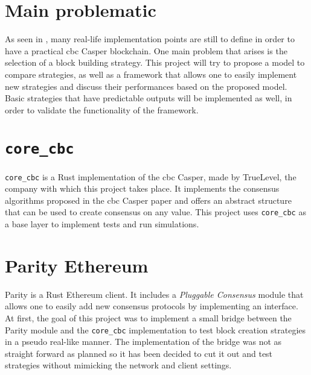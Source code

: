 \section{Main problematic}
As seen in , many real-life implementation points are still
to define in order to have a practical \gls{cbc} Casper blockchain. One main
problem that arises is the selection of a block building strategy. This project
will try to propose a model to compare strategies, as well as a framework that
allows one to easily implement new strategies and discuss their performances
based on the proposed model.  Basic strategies that have predictable outputs
will be implemented as well, in order to validate the functionality of the
framework.

\section{\texttt{core\_cbc}}
\texttt{core\_cbc} is a Rust implementation of the \gls{cbc} Casper, made by
TrueLevel, the company with which this project takes place. It implements the
consensus algorithms proposed in the \gls{cbc} Casper paper and offers an
abstract structure that can be used to create consensus on any value. This
project uses \texttt{core\_cbc} as a base layer to implement tests and run
simulations.

\section{Parity Ethereum}
Parity is a Rust Ethereum client. It includes a \textit{Pluggable Consensus}
module that allows one to easily add new consensus protocols by implementing an
interface.  At first, the goal of this project was to implement a small bridge
between the Parity module and the \texttt{core\_cbc} implementation to test block creation
strategies in a pseudo real-like manner. The implementation of the bridge was
not as straight forward as planned so it has been decided to cut it out and test
strategies without mimicking the network and client settings.

